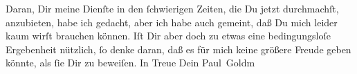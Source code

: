 \begin{ledgroupsized}[t]{13cm}
           \pstart
           Daran, Dir meine Dienſte in den ſchwierigen Zeiten, die Du jetzt durchmachſt,
               anzubieten, habe ich \strikeout{\textcolor{gray}{×}} gedacht, aber ich habe  auch gemeint, daß
               Du mich leider kaum wirſt brauchen können. Iſt Dir aber doch zu etwas eine
               bedingungsloſe Ergebenheit nützlich, ſo denke daran, daß es für mich keine größere
               Freude geben könnte, als ſie Dir zu beweiſen.\pend
           \pstart In Treue Dein \spacefill\mbox{Paul Goldm}\pend{}
         
         \endnumbering{}\end{ledgroupsized}  \newcommand{\dateiname}{L02708}\newcommand{\titel}{Paul Goldmann an Arthur Schnitzler, 17. 5. [1893]}\newcommand{\editorInnen}{Martin Anton Müller und Laura Untner}
      